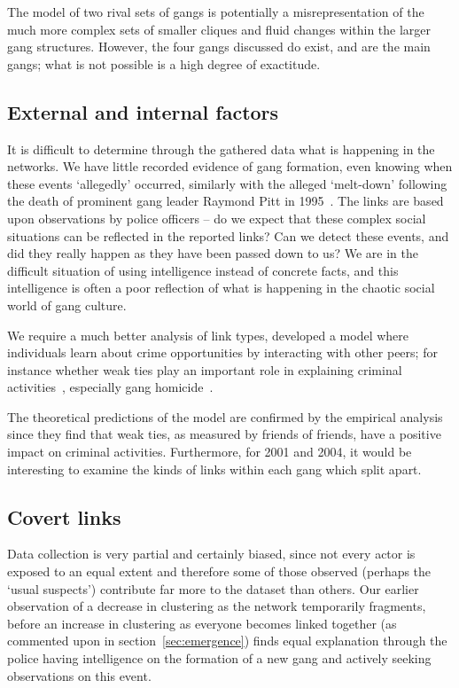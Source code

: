 \documentclass[twocolumn]{svjour3}          %
\theoremstyle{definition}
\begin{document}
The model of two rival sets of gangs is potentially a
misrepresentation of the much more complex sets of smaller cliques and
fluid changes within the larger gang structures. However, the four
gangs discussed do exist, and are the main gangs; what is not possible
is a high degree of exactitude.

\subsection{External and internal factors}

It is difficult to determine through the gathered data what is
happening in the networks. We have little recorded evidence of gang
formation, even knowing when these events `allegedly' occurred,
similarly with the alleged `melt-down' following the death of
prominent gang leader Raymond Pitt in 1995~\citep{Walsh2005}. The links
are based upon observations by police officers -- do we expect that
these complex social situations can be reflected in the reported
links? Can we detect these events, and did they really happen as they
have been passed down to us? We are in the difficult situation of
using intelligence instead of concrete facts, and this intelligence is
often a poor reflection of what is happening in the chaotic social
world of gang culture.

We require a much better analysis of link types, developed a model
where individuals learn about crime opportunities by interacting with
other peers; for instance whether weak ties play an important role in
explaining criminal activities~\citep{PatacchiniZenou2008}, especially
gang homicide~\citep{papachristos:2009}.

The theoretical predictions of the model are confirmed by the
empirical analysis since they find that weak ties, as measured by
friends of friends, have a positive impact on criminal
activities. Furthermore, for 2001 and 2004, it would be interesting to
examine the kinds of links within each gang which split apart.

\subsection{Covert links}

Data collection is very partial and certainly biased, since not every
actor is exposed to an equal extent and therefore some of those
observed (perhaps the `usual suspects') contribute far more to the
dataset than others. Our earlier observation of a decrease in
clustering as the network temporarily fragments, before an increase in
clustering as everyone becomes linked together (as commented upon in
section~\ref{sec:emergence}) finds equal explanation through the
police having intelligence on the formation of a new gang and actively
seeking observations on this event.
\end{document}
